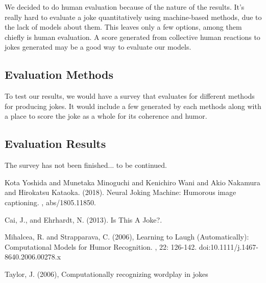 \documentclass[twoside,twocolumn]{article}
\begin{document}
We decided to do human evaluation because of the nature of the results. It's really hard to evaluate a joke quantitatively using machine-based methods, due to the lack of models about them. This leaves only a few options, among them chiefly is human evaluation. A score generated from collective human reactions to jokes generated may be a good way to evaluate our models.

\subsection{Evaluation Methods}

To test our results, we would have a survey that evaluates for different methods for producing jokes. It would include a few generated by each methods along with a place to score the joke as a whole for its coherence and humor.

\subsection{Evaluation Results}

The survey has not been finished... to be continued.



\begin{thebibliography}{99} %


Kota Yoshida and Munetaka Minoguchi and Kenichiro Wani and Akio Nakamura and Hirokatsu Kataoka. (2018).
\newblock Neural Joking Machine: Humorous image captioning.
, abs/1805.11850.

Cai, J., and Ehrhardt, N. (2013). 
\newblock Is This A Joke?.

Mihalcea, R. and Strapparava, C. (2006), 
\newblock Learning to Laugh (Automatically): Computational Models for Humor Recognition.
, 22: 126-142. doi:10.1111/j.1467-8640.2006.00278.x

Taylor, J. (2006), 
\newblock Computationally recognizing wordplay in jokes

\end{thebibliography}

\end{document}
